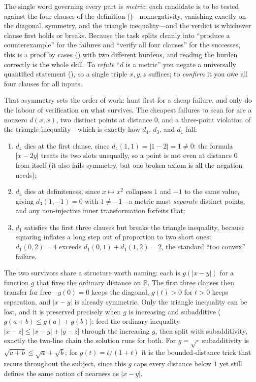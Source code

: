 \documentclass[main.tex]{subfiles}
\begin{document}
\begin{Reflection}
The single word governing every part is \emph{metric}: each candidate is to be tested against the four
clauses of the definition ()---nonnegativity, vanishing exactly on the diagonal, symmetry,
and the triangle inequality---and the verdict is whichever clause first holds or breaks. Because the
task splits cleanly into ``produce a counterexample'' for the failures and ``verify all four clauses''
for the successes, this is a proof by cases () with two different burdens, and reading the
burden correctly is the whole skill. To \emph{refute} ``$d$ is a metric'' you negate a universally
quantified statement (), so a single triple $x,y,z$ suffices; to \emph{confirm} it you owe
all four clauses for all inputs.

That asymmetry sets the order of work: hunt first for a cheap failure, and only do the labour of
verification on what survives. The cheapest failures to scan for are a nonzero $d(x,x)$, two distinct
points at distance $0$, and a three-point violation of the triangle inequality---which is exactly how
$d_{4}$, $d_{3}$, and $d_{1}$ fall:
\begin{enumerate}[leftmargin=1.7em,itemsep=3pt,topsep=2pt,label=\textnormal{(\arabic*)}]
  \item $d_{4}$ dies at the first clause, since $d_{4}(1,1)=|1-2|=1\neq 0$: the formula $|x-2y|$ treats
        its two slots unequally, so a point is not even at distance $0$ from itself (it also fails
        symmetry, but one broken axiom is all the negation needs);
  \item $d_{3}$ dies at definiteness, since $x\mapsto x^{2}$ collapses $1$ and $-1$ to the same value,
        giving $d_{3}(1,-1)=0$ with $1\neq-1$---a metric must \emph{separate} distinct points, and any
        non-injective inner transformation forfeits that;
  \item $d_{1}$ satisfies the first three clauses but breaks the triangle inequality, because squaring
        inflates a long step out of proportion to two short ones: $d_{1}(0,2)=4$ exceeds
        $d_{1}(0,1)+d_{1}(1,2)=2$, the standard ``too convex'' failure.
\end{enumerate}

The two survivors share a structure worth naming: each is $g(|x-y|)$ for a function $g$ that fixes the
ordinary distance on $\mathbb R$. The first three clauses then transfer for free---$g(0)=0$ keeps the
diagonal, $g(t)>0$ for $t>0$ keeps separation, and $|x-y|$ is already symmetric. Only the triangle
inequality can be lost, and it is preserved precisely when $g$ is increasing and subadditive
($g(a+b)\le g(a)+g(b)$): feed the ordinary inequality $|x-z|\le|x-y|+|y-z|$ through the increasing $g$,
then split with subadditivity, exactly the two-line chain the solution runs for both. For $g=\sqrt{\cdot}$
subadditivity is $\sqrt{a+b}\le\sqrt a+\sqrt b$; for $g(t)=t/(1+t)$ it is the bounded-distance trick that
recurs throughout the subject, since this $g$ caps every distance below $1$ yet still defines the same
notion of nearness as $|x-y|$.


\end{Reflection}
\end{document}
